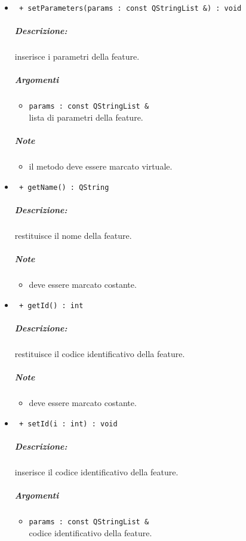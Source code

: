 \begin{itemize}
	\item \color{blue}\verb! + setParameters(params : const QStringList &) : void !
		\color{black}
		\subparagraph{Descrizione:} inserisce i parametri della feature\g{}.
		\subparagraph{Argomenti}
			\begin{itemize}
				\item \color{RoyalPurple} \verb!params : const QStringList & ! \\ 
				\color{black} lista di parametri della feature.		
			\end{itemize}
		\subparagraph{Note}
			\begin{itemize}
				\item il metodo deve essere marcato virtuale.
			\end{itemize}
		
	\item \color{blue}\verb! + getName() : QString!
		\color{black}
		\subparagraph{Descrizione:} restituisce il nome della feature\g{}.
		\subparagraph{Note}
			\begin{itemize}
				\item deve essere marcato costante.
			\end{itemize}
			
	\item \color{blue}\verb! + getId() : int!
		\color{black}
		\subparagraph{Descrizione:} restituisce il codice identificativo della feature\g{}.
		\subparagraph{Note}
			\begin{itemize}
				\item deve essere marcato costante.
			\end{itemize}
			
	\item \color{blue}\verb! + setId(i : int) : void!
		\color{black}
		\subparagraph{Descrizione:} inserisce il codice identificativo della feature.
		\subparagraph{Argomenti}
			\begin{itemize}
				\item \color{RoyalPurple} \verb!params : const QStringList & ! \\ 
				\color{black} codice identificativo della feature.		
			\end{itemize}

	\end{itemize}
	

\color{black}
\pagebreak
